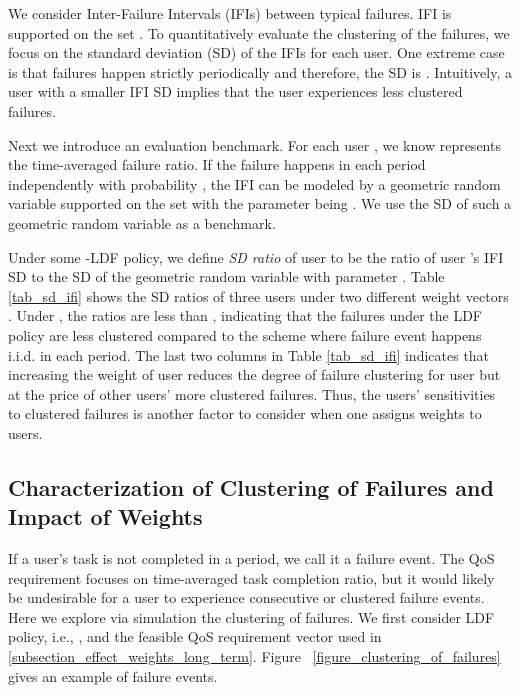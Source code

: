 \documentclass[prodmode,acmtompecs]{acmsmall}
\newcommand{\myComments}[1]{}
\newif\ifdissertation
\newcommand{\dissertationStart}{\ifdissertation  \myComments{Dissertation version: }}
\begin{document}
We consider Inter-Failure Intervals (IFIs) between typical failures. 
IFI is supported on the set . To quantitatively evaluate the clustering of the failures, we focus on the standard deviation (SD) of the IFIs for each user. 
One extreme case is that failures happen strictly periodically and therefore, the SD is . 
Intuitively, a user with a smaller IFI SD implies that the user experiences less clustered failures. 

Next we introduce an evaluation benchmark. 
For each user , we know  represents the time-averaged failure ratio. 
If the failure happens in each period independently with probability , the IFI can be modeled by a geometric random variable supported on the set  with the parameter being . We use the SD of such a geometric random variable as a benchmark.  

Under some -LDF policy, we define {\em SD ratio} of user  to be the ratio of user 's IFI SD to the SD of the geometric random variable with parameter . 
Table \ref{tab_sd_ifi} shows the SD ratios of three users under two different weight vectors . 
Under , the ratios are less than , indicating that the failures under the LDF policy are less clustered compared to the scheme where failure event happens i.i.d. in each period. 
The last two columns in Table \ref{tab_sd_ifi} indicates that increasing the weight of user  reduces the degree of failure clustering for user  but at the price of other users' more clustered failures. Thus, the users' sensitivities to clustered failures is another factor to consider when one assigns weights to users. 


\begin{table}[h]
\normalsize
\end{table}

\dissertationStart
\subsection{Characterization of Clustering of Failures and Impact of Weights}
\label{subsection_characterization_of_failure_clustering}
If a user's task is not completed in a period, we call it a failure event. The QoS requirement focuses on time-averaged task completion ratio, but it would likely be undesirable for a user to experience consecutive or clustered failure events. Here we explore via simulation the clustering of failures.
We first consider LDF policy, i.e., , and the feasible QoS requirement vector  used in \ref{subsection_effect_weights_long_term}. Figure~ \ref{figure_clustering_of_failures} gives an example of failure events. 
\end{document}
